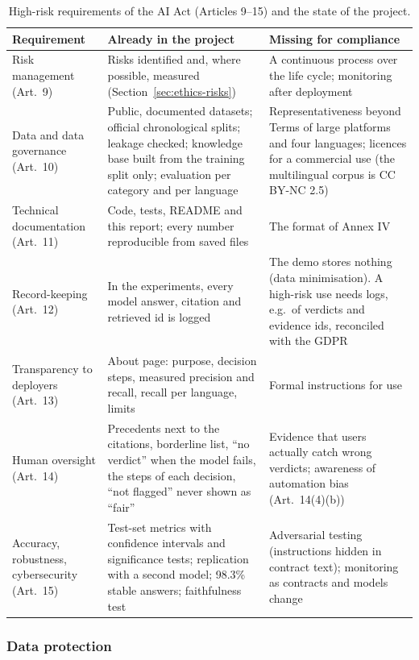 \begin{table}[t]
\centering\small
\caption{High-risk requirements of the AI Act (Articles 9--15) and the state of the project.}
\label{tab:highrisk}
\begin{tabularx}{\textwidth}{@{}P{2.9cm}YY@{}}
\toprule
Requirement & Already in the project & Missing for compliance \\
\midrule
Risk management (Art.~9) & Risks identified and, where possible, measured (Section~\ref{sec:ethics-risks}) & A continuous process over the life cycle; monitoring after deployment \\
Data and data governance (Art.~10) & Public, documented datasets; official chronological splits; leakage checked; knowledge base built from the training split only; evaluation per category and per language & Representativeness beyond Terms of large platforms and four languages; licences for a commercial use (the multilingual corpus is CC BY-NC 2.5) \\
Technical documentation (Art.~11) & Code, tests, README and this report; every number reproducible from saved files & The format of Annex IV \\
Record-keeping (Art.~12) & In the experiments, every model answer, citation and retrieved id is logged & The demo stores nothing (data minimisation). A high-risk use needs logs, e.g.\ of verdicts and evidence ids, reconciled with the GDPR \\
Transparency to deployers (Art.~13) & About page: purpose, decision steps, measured precision and recall, recall per language, limits & Formal instructions for use \\
Human oversight (Art.~14) & Precedents next to the citations, borderline list, ``no verdict'' when the model fails, the steps of each decision, ``not flagged'' never shown as ``fair'' & Evidence that users actually catch wrong verdicts; awareness of automation bias (Art.~14(4)(b)) \\
Accuracy, robustness, cybersecurity (Art.~15) & Test-set metrics with confidence intervals and significance tests; replication with a second model; 98.3\% stable answers; faithfulness test & Adversarial testing (instructions hidden in contract text); monitoring as contracts and models change \\
\bottomrule
\end{tabularx}
\end{table}

\subsubsection{Data protection}
\label{sec:ethics-gdpr}

